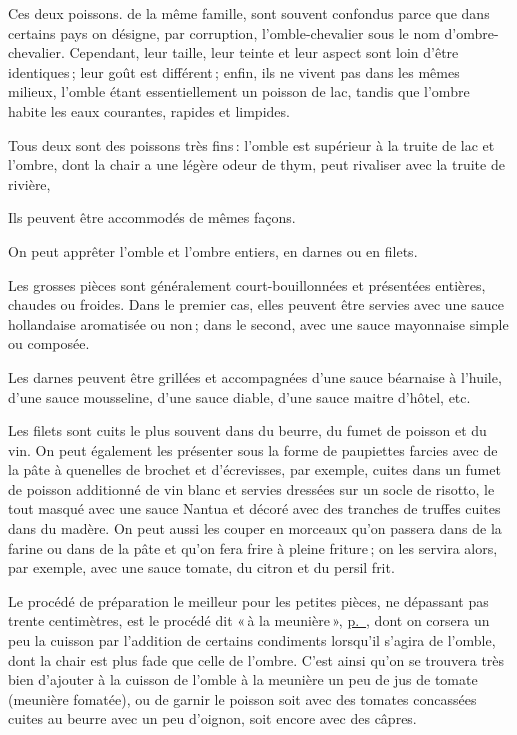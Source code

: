 
Ces deux poissons. de la même famille, sont souvent confondus parce que dans
certains pays on désigne, par corruption, l'omble-chevalier sous le nom
d'ombre-chevalier. Cependant, leur taille, leur teinte et leur aspect sont loin
d'être identiques ; leur goût est différent ; enfin, ils ne vivent pas dans les
mêmes milieux, l’omble étant essentiellement un poisson de lac, tandis que
l'ombre habite les eaux courantes, rapides et limpides.

Tous deux sont des poissons très fins : l’omble est supérieur à la truite de lac
et l'ombre, dont la chair a une légère odeur de thym, peut rivaliser avec la truite
de rivière,

Ils peuvent être accommodés de mêmes façons.

On peut apprêter l'omble et l'ombre entiers, en darnes ou en filets.

Les grosses pièces sont généralement court-bouillonnées et présentées entières,
chaudes ou froides. Dans le premier cas, elles peuvent être servies avec une
sauce hollandaise aromatisée ou non ; dans le second, avec une sauce mayonnaise
simple ou composée.

Les darnes peuvent être grillées et accompagnées d'une sauce béarnaise
à l'huile, d'une sauce mousseline, d'une sauce diable, d'une sauce maitre
d'hôtel, etc.

Les filets sont cuits le plus souvent dans du beurre, du fumet de poisson et du
vin. On peut également les présenter sous la forme de paupiettes farcies avec de
la pâte à quenelles de brochet et d'écrevisses, par exemple, cuites dans un fumet
de poisson additionné de vin blanc et servies dressées sur un socle de risotto, le
tout masqué avec une sauce Nantua et décoré avec des tranches de truffes cuites
dans du madère. On peut aussi les couper en morceaux qu'on passera dans de la
farine ou dans de la pâte et qu'on fera frire à pleine friture ; on les servira alors,
par exemple, avec une sauce tomate, du citron et du persil frit.

Le procédé de préparation le meilleur pour les petites pièces, ne dépassant pas
trente centimètres, est le procédé dit « à la meunière »,
\hyperlink{p0332}{p. \pageref{pg0332}}, dont on corsera un peu la cuisson par
l'addition de certains condiments lorsqu'il s'agira de l'omble, dont la chair
est plus fade que celle de l'ombre. C'est ainsi qu'on se trouvera très bien
d'ajouter à la cuisson de l'omble à la meunière un peu de jus de tomate
(meunière fomatée), ou de garnir le poisson soit avec des tomates concassées
cuites au beurre avec un peu d'oignon, soit encore avec des câpres.

